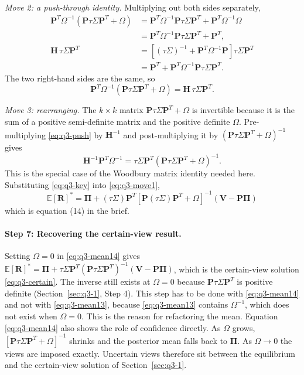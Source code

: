 \documentclass[11pt]{article}
\numberwithin{equation}{section}
\begin{document}
\textit{Move 2: a push-through identity.} Multiplying out both sides separately,
\begin{align*}
  \bm{P}^{T}\Omega^{-1}\left(\bm{P}\tau\Sigma\bm{P}^{T} + \Omega\right)
  &= \bm{P}^{T}\Omega^{-1}\bm{P}\tau\Sigma\bm{P}^{T} + \bm{P}^{T}\Omega^{-1}\Omega \\
  &= \bm{P}^{T}\Omega^{-1}\bm{P}\tau\Sigma\bm{P}^{T} + \bm{P}^{T}, \\
  \bm{H}\,\tau\Sigma\bm{P}^{T}
  &= \left[(\tau\Sigma)^{-1} + \bm{P}^{T}\Omega^{-1}\bm{P}\right]\tau\Sigma\bm{P}^{T} \\
  &= \bm{P}^{T} + \bm{P}^{T}\Omega^{-1}\bm{P}\tau\Sigma\bm{P}^{T}.
\end{align*}
The two right-hand sides are the same, so
\begin{equation}
  \bm{P}^{T}\Omega^{-1}\left(\bm{P}\tau\Sigma\bm{P}^{T} + \Omega\right) = \bm{H}\,\tau\Sigma\bm{P}^{T}.
  \label{eq:q3-push}
\end{equation}

\textit{Move 3: rearranging.} The $k \times k$ matrix $\bm{P}\tau\Sigma\bm{P}^{T} + \Omega$ is invertible because it is the sum of a positive semi-definite matrix and the positive definite $\Omega$. Pre-multiplying \eqref{eq:q3-push} by $\bm{H}^{-1}$ and post-multiplying it by $(\bm{P}\tau\Sigma\bm{P}^{T} + \Omega)^{-1}$ gives
\begin{equation}
  \bm{H}^{-1}\bm{P}^{T}\Omega^{-1} = \tau\Sigma\bm{P}^{T}\left(\bm{P}\tau\Sigma\bm{P}^{T} + \Omega\right)^{-1}.
  \label{eq:q3-key}
\end{equation}
This is the special case of the Woodbury matrix identity needed here. Substituting \eqref{eq:q3-key} into \eqref{eq:q3-move1},
\begin{equation}
  \boxed{\;\mathbb{E}[\bm{R}]^{*} = \bm{\Pi} + (\tau\Sigma)\bm{P}^{T}\left[\bm{P}(\tau\Sigma)\bm{P}^{T} + \Omega\right]^{-1}\left(\bm{V} - \bm{P}\bm{\Pi}\right)\;}
  \label{eq:q3-mean14}
\end{equation}
which is equation (14) in the brief.

\paragraph{Step 7: Recovering the certain-view result.}
Setting $\Omega = 0$ in \eqref{eq:q3-mean14} gives $\mathbb{E}[\bm{R}]^{*} = \bm{\Pi} + \tau\Sigma\bm{P}^{T}\left(\bm{P}\tau\Sigma\bm{P}^{T}\right)^{-1}\left(\bm{V} - \bm{P}\bm{\Pi}\right)$, which is the certain-view solution \eqref{eq:q3-certain}. The inverse still exists at $\Omega = 0$ because $\bm{P}\tau\Sigma\bm{P}^{T}$ is positive definite (Section~\ref{sec:q3-1}, Step 4). This step has to be done with \eqref{eq:q3-mean14} and not with \eqref{eq:q3-mean13}, because \eqref{eq:q3-mean13} contains $\Omega^{-1}$, which does not exist when $\Omega = 0$. This is the reason for refactoring the mean. Equation \eqref{eq:q3-mean14} also shows the role of confidence directly. As $\Omega$ grows, $\left[\bm{P}\tau\Sigma\bm{P}^{T} + \Omega\right]^{-1}$ shrinks and the posterior mean falls back to $\bm{\Pi}$. As $\Omega \to 0$ the views are imposed exactly. Uncertain views therefore sit between the equilibrium and the certain-view solution of Section~\ref{sec:q3-1}.
\end{document}

